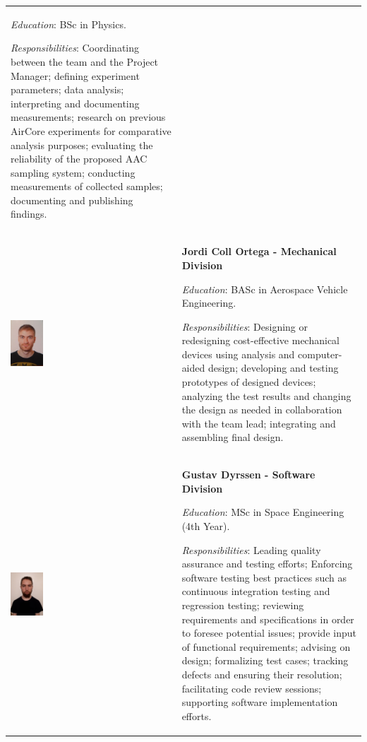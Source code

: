 \begin{longtable}[]{m{} m{}}
\smallskip
\textit{Education}: BSc in Physics.


\smallskip
\textit{Responsibilities}: Coordinating between the team and the Project Manager; defining experiment parameters; data analysis; interpreting and documenting measurements; research on previous AirCore experiments for comparative analysis purposes; evaluating the reliability of the proposed AAC sampling system; conducting measurements of collected samples; documenting and publishing findings. 
\bigskip
\\

\includegraphics[width=0.2\textwidth]{1-introduction/img/jordi-coll-ortega.jpg} & \textbf{Jordi Coll Ortega - Mechanical Division}

\smallskip
\textit{Education}: BASc in Aerospace Vehicle Engineering.

\smallskip
\textit{Responsibilities}: Designing or redesigning cost-effective mechanical devices using analysis and computer-aided design; developing and testing prototypes of designed devices; analyzing the test results and changing the design as needed in collaboration with the team lead; integrating and assembling final design.
\bigskip
\\

\includegraphics[width=0.2\textwidth]{1-introduction/img/gustav-dryssen.jpg} & \textbf{Gustav Dyrssen - Software Division}

\smallskip
\textit{Education}: MSc in Space Engineering (4th Year).

\smallskip
\textit{Responsibilities}: Leading quality assurance and testing efforts; Enforcing software testing best practices such as continuous integration testing and regression testing; reviewing requirements and specifications in order to foresee potential issues; provide input of functional requirements; advising on design; formalizing test cases; tracking defects and ensuring their resolution; facilitating code review sessions; supporting software implementation efforts.     
\bigskip
\\



\end{longtable}
